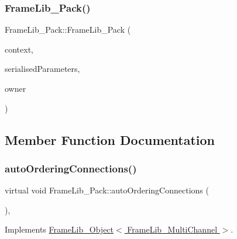 \subsubsection{\texorpdfstring{Frame\+Lib\+\_\+\+Pack()}{FrameLib\_Pack()}}
{\footnotesize\ttfamily Frame\+Lib\+\_\+\+Pack\+::\+Frame\+Lib\+\_\+\+Pack (\begin{DoxyParamCaption}\item[{\hyperlink{class_frame_lib___context}{Frame\+Lib\+\_\+\+Context}}]{context,  }\item[{\hyperlink{class_frame_lib___parameters_1_1_serial}{Frame\+Lib\+\_\+\+Parameters\+::\+Serial} $\ast$}]{serialised\+Parameters,  }\item[{void $\ast$}]{owner }\end{DoxyParamCaption})}



\subsection{Member Function Documentation}
\mbox{\label{class_frame_lib___pack_aacf276d3ed114e4aa03b8e640164d116}} 
\subsubsection{\texorpdfstring{auto\+Ordering\+Connections()}{autoOrderingConnections()}}
{\footnotesize\ttfamily virtual void Frame\+Lib\+\_\+\+Pack\+::auto\+Ordering\+Connections (\begin{DoxyParamCaption}{ }\end{DoxyParamCaption})\hspace{0.3cm}{\ttfamily [inline]}, {\ttfamily [virtual]}}



Implements \hyperlink{class_frame_lib___object_afa5bb93302a641c23b5eac7ab0dfe516}{Frame\+Lib\+\_\+\+Object$<$ Frame\+Lib\+\_\+\+Multi\+Channel $>$}.

\mbox{\label{class_frame_lib___pack_af0b40307726462df7754ead87c7c8a9c}} 
